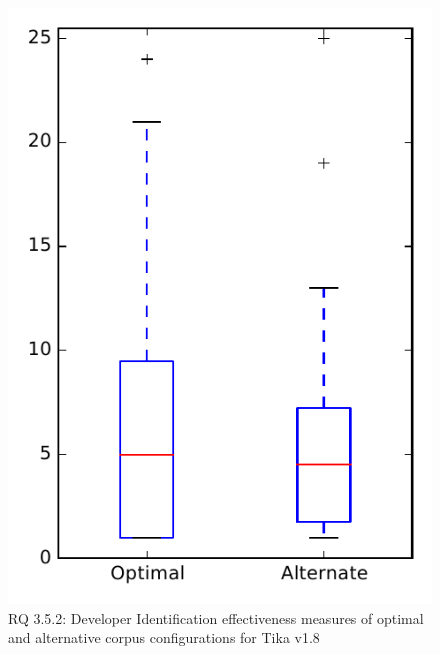 
\begin{figure}
\centering
\includegraphics[height=0.4\textheight]{figures/combo/dit_rq2_tika}
\caption{RQ 3.5.2: Developer Identification effectiveness measures of optimal and alternative corpus configurations for Tika v1.8}
\label{fig:combo:dit:rq2:tika}
\end{figure}
